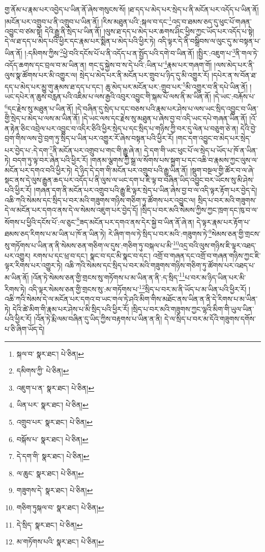 གྱ་ནོམ་པ་རྣམ་པར་འབྱེད་པ་ཡིན་ནོ་ཞེས་གསུངས་སོ། །ཐ་དད་པ་མེད་པར་སྲེད་པ་ནི་མངོན་པར་འདོད་པ་ཡིན་ནོ། །མངོན་པར་འགྲུབ་པ་ནི་འགྲུབ་པ་ཡིན་ནོ། །རིས་མཐུན་པའི་:སྐལ་བ་དང་\footnote{སྐལ་བ་  སྣར་ཐང་།  པེ་ཅིན། }འདྲ་བ་ཐམས་ཅད་དུ་ཕུང་པོ་གཞན་འབྱུང་བ་ཙམ་སྟེ། དེའི་རྒྱུ་ནི་སྲེད་པ་ཡིན་ནོ། །ལུས་ཐ་དད་པ་མེད་པར་ཆགས་ཤིང་ཕྱིས་ཀྱང་ཡོད་པར་འདོད་པ་སྟེ། དེ་ལ་ཐ་དད་པ་མེད་པའི་ཕྱིར་དང་རྣམ་པར་སྨིན་པ་མེད་པའི་ཕྱིར་ཏེ། འདི་ལྟར་དེ་ནི་བསྒྲིབས་ལ་ལུང་དུ་མ་བསྟན་པ་ཡིན་ནོ། །:དམིགས་ཀྱིས་\footnote{དམིགས་ཀྱི་  པེ་ཅིན། }ཕྱེ་བའི་དངོས་པོ་པ་ནི་འདོད་པ་ན་སྤྱོད་པའི་དགེ་བ་ཡིན་ནོ། །སྤྱིར་:འཇུག་པ་\footnote{འཇུག་པ་ན་  སྣར་ཐང་།  པེ་ཅིན། }ནི་གལ་ཏེ་འདོད་ཆགས་དང་བྲལ་བ་མ་ཡིན་ན། གང་དུ་སྐྱེས་བ་ས་དེ་པའི་:ཡིན་པ་\footnote{ཡིན་པར་  སྣར་ཐང་།  པེ་ཅིན། }རྣམ་པར་གཞག་གོ། །ལས་མེད་པར་ནི་ལུས་སྣ་ཚོགས་པར་མི་འགྱུར་ལ། སྲེད་པ་མེད་པར་ནི་མངོན་པར་གྲུབ་པ་ཉིད་དུ་མི་འགྱུར་རོ། །དཔེར་ན་ས་བོན་ཐ་དད་པ་མེད་པར་མྱུ་གུ་རྣམས་ཐ་དད་པ་དང་། ཆུ་མེད་པར་མངོན་པར་:གྲུབ་པར་\footnote{འགྲུབ་པར་  སྣར་ཐང་།  པེ་ཅིན། }མི་འགྱུར་བ་ནི་དཔེ་ཡིན་ནོ། །ཡང་དཔེར་ན་ཆུས་བརླན་པའི་འཇིམ་པ་ལས་རྒྱའི་འབུར་འབྱུང་གི་སྐམ་པོ་ལས་ནི་མ་ཡིན་ནོ། །དེ་ཡང་:བརྐོས་པ་\footnote{བསྐོས་པ་  སྣར་ཐང་།  པེ་ཅིན། }དང་རྗེས་སུ་མཐུན་པ་ཡིན་ནོ། །དེ་བཞིན་དུ་སྲེད་པ་དང་བཅས་པའི་རྣམ་པར་ཤེས་པ་ལས་ཡང་སྲིད་འབྱུང་བ་ཡིན་གྱི་སྲེད་པ་མེད་པ་ལས་མ་ཡིན་ནོ། །དེ་ཡང་ལས་དང་རྗེས་སུ་མཐུན་པ་ཞེས་བྱ་བ་འདི་ཡང་དཔེ་གཞན་ཡིན་ནོ། །འོ་ན་རྟེན་ཅིང་འབྲེལ་པར་འབྱུང་བ་འདིར་ཅིའི་ཕྱིར་སྲེད་པ་དང་སྲིད་པ་གཉིས་ཀྱི་བར་དུ་ལེན་པ་བཅུག་ཅེ་ན། དེའི་བྱེ་བྲག་གིས་ལས་བྱེ་བྲག་ཏུ་སྲིད་པ་ཡིན་པར་འགྱུར་རོ་ཞེས་བསྟན་པའི་ཕྱིར་རོ། །གང་དག་འབྱུང་བ་མེད་པར་སྲེད་པར་བྱེད་པ་:དེ་དག་\footnote{དེ་དག་གི་  སྣར་ཐང་།  པེ་ཅིན། }ནི་མངོན་པར་འགྲུབ་པ་གང་གི་རྒྱུ་ཞེ་ན། དེ་དག་གི་ཡང་ཕུང་པོ་ལ་སྲེད་པ་ཡོད་པ་ཁོ་ན་ཡིན་ཏེ། བདག་ཏུ་ལྟ་བར་ཞེན་པའི་ཕྱིར་རོ། །གནམ་ལྕགས་ཀྱི་སྒྲ་ལ་སོགས་པས་སྐྲག་པ་དང་འཆི་བ་རྣམས་ཀྱང་ལུས་ལ་མངོན་པར་དགའ་བའི་ཕྱིར་ཏེ། དེ་ཉིད་དེ་དག་གི་མངོན་པར་འགྲུབ་པའི་རྒྱུ་ཡིན་ནོ། །སྡུག་བསྔལ་གྱི་ཚོར་བ་ལ་ཞེ་སྡང་ནས་དེ་ལུས་རྒྱུན་ཆད་པར་འདོད་པ་ནི་ལུས་ལ་ཡང་དག་པ་ཇི་ལྟ་བ་བཞིན་ཡིད་འབྱུང་བར་ཡོངས་སུ་མི་ཤེས་པའི་ཕྱིར་རོ། །གཞན་དག་ནི་མངོན་པར་འགྲུབ་པའི་རྒྱུ་ཇི་ལྟར་སྲེད་པ་ཡིན་ཞེས་བྱ་བ་ལ་འདི་ལྟར་རྟོག་པར་བྱེད་དེ། འཆི་ཀའི་སེམས་དང་སྲིད་པ་བར་མའི་གཟུགས་གཉིས་གཅིག་ཏུ་ཚོགས་པར་འབྱུང་ལ། སྲིད་པ་བར་མའི་གཟུགས་དེ་ལ་མངོན་པར་དགའ་ནས་དེ་ལ་སེམས་འཇུག་པར་བྱེད་དོ། །སྲིད་པ་བར་མའི་སེམས་ཀྱིས་ཀྱང་ཁྲག་དང་ཁུ་བ་ལ་སོགས་པ་ཕྱིའི་དངོས་པོ་:ལ་ཅུང་\footnote{ལ་ཆུང་  སྣར་ཐང་།  པེ་ཅིན། }ཟད་མངོན་པར་དགའ་ནས་དེར་སྐྱེ་བ་ཡིན་ནོ་ཞེ་ན། དེ་ལྟར་རྣམ་པར་རྟོག་པ་ཐམས་ཅད་རིགས་པ་མ་ཡིན་པ་ཁོ་ན་ཡིན་ཏེ། རེ་ཞིག་གལ་ཏེ་སྲིད་པ་བར་མའི་:གཟུགས་ཏེ་\footnote{གཟུགས་དེ་  སྣར་ཐང་།  པེ་ཅིན། }སེམས་ཅན་གྱི་གྲངས་སུ་གཏོགས་པ་ཡིན་ན་ནི་སེམས་ཅན་གཅིག་ལ་དུས་:གཅིག་ཏུ་བསྐལ་པ་མི་\footnote{གཅིག་ཏུསྐལ་བ་  སྣར་ཐང་།  པེ་ཅིན། }འདྲ་བའི་ལུས་གཉིས་ཇི་ལྟར་འཐད་པར་འགྱུར། རགས་པ་དང་ཕྲ་བ་དང་། སྣང་བ་དང་མི་སྣང་བ་དང་། འགྲོ་བ་གཞན་དང་འགྲོ་བ་གཞན་གཉིས་ཀྱང་ཇི་ལྟར་རིགས་པར་འགྱུར་ཏེ། འཆི་ཀའི་སེམས་དང་སྲིད་པ་བར་མའི་གཟུགས་གཉིས་གཅིག་ཏུ་ཚོགས་པར་འཐད་པ་མ་ཡིན་ནོ། །འོན་ཏེ་སེམས་ཅན་གྱི་གྲངས་སུ་གཏོགས་པ་མ་ཡིན་ན་ནི་:ད་སྲིད་\footnote{དེ་སྲིད་  སྣར་ཐང་།  པེ་ཅིན། }པ་བར་མ་ཉིད་ཡིན་པར་མི་རིགས་ཏེ། འདི་ལྟར་སེམས་ཅན་གྱི་གྲངས་སུ་:མ་གཏོགས་པ་\footnote{མ་གཏོགས་པའི་  སྣར་ཐང་།  པེ་ཅིན། }སྲིད་པ་བར་མ་ནི་ཡོད་པ་མ་ཡིན་པའི་ཕྱིར་རོ། །འཆི་ཀའི་སེམས་དེ་ལ་མངོན་པར་དགའ་བ་ཡང་གལ་ཏེ་ཤའི་མིག་གིས་མཐོང་ནས་ཡིན་ན་ནི་དེ་རིགས་པ་མ་ཡིན་ཏེ། དེའི་ཚེ་མིག་གི་རྣམ་པར་ཤེས་པ་མི་སྲིད་པའི་ཕྱིར་རོ། །སྲིད་པ་བར་མའི་གཟུགས་ཀྱང་ལྷའི་མིག་གི་ཡུལ་ཡིན་པའི་ཕྱིར་རོ། །འོན་ཏེ་རྨི་ལམ་བཞིན་དུ་ཡིད་ཀྱིས་བརྟགས་པ་ཡིན་ན་ནི། དེ་ལ་སྲིད་པ་བར་མ་དོའི་གཟུགས་དགོས་པ་ཅི་ཞིག་ཡོད་དེ། 